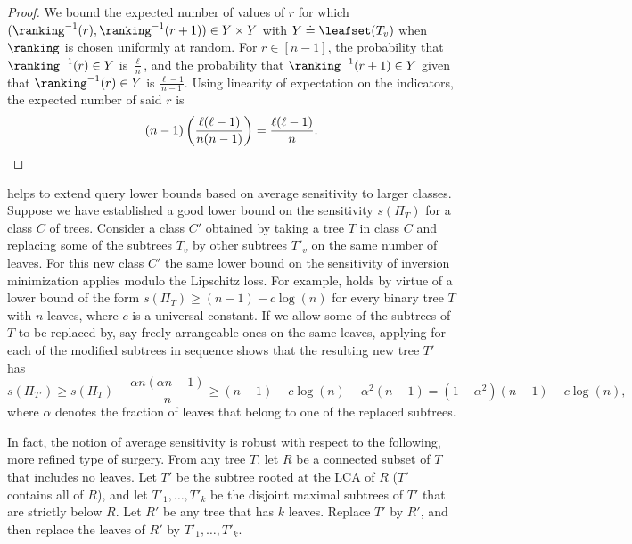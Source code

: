 \documentclass{toc}
\begin{document}
\begin{proof}
We bound the expected number of values of $r$ for which $(\ranking^{-1}(r),\ranking^{-1}(r+1)) \in Y \times Y$ with $Y \doteq \leafset(T_v)$ when $\ranking$ is chosen uniformly at random. For $r \in [n-1]$, the probability that $\ranking^{-1}(r) \in Y$ is $\frac{\ell}{n}$, and the probability that $\ranking^{-1}(r+1)\in Y$ given that $\ranking^{-1}(r)\in Y$ is $\frac{\ell-1}{n-1}$. Using linearity of expectation on the indicators, the expected number of said $r$ is 
    \begin{equation*}
        (n-1)\left(\frac{\ell(\ell-1)}{n(n-1)}\right) = \frac{\ell(\ell-1)}{n}. \qedhere
    \end{equation*}
\end{proof}

 helps to extend query lower bounds based on average sensitivity to larger classes. Suppose we have established a good lower bound on the sensitivity $s(\Pi_T)$ for a class $C$ of trees. Consider a class $C'$ obtained by taking a tree $T$ in class $C$ and replacing some of the subtrees $T_v$ by other subtrees $T'_v$ on the same number of leaves. For this new class $C'$ the same lower bound on the sensitivity of inversion minimization applies modulo the Lipschitz loss. For example,  holds by virtue of a lower bound of the form $s(\Pi_T) \ge (n-1) - c \log(n)$ for every binary tree $T$ with $n$ leaves, where $c$ is a universal constant. If we allow some of the subtrees of $T$ to be replaced by, say freely arrangeable ones on the same leaves, applying  for each of the modified subtrees in sequence shows that the resulting new tree $T'$ has 
\[ s(\Pi_{T'}) \ge s(\Pi_T) - \frac{\alpha n (\alpha n - 1)}{n} 
\ge (n-1) - c \log(n) - \alpha^2 (n-1) = (1-\alpha^2)(n-1) - c \log(n), \]
where $\alpha$ denotes the fraction of leaves that belong to one of the replaced subtrees.

In fact, the notion of average sensitivity is robust with respect to the following, more refined type of surgery. From any tree $T$, let $R$ be a connected subset of $T$ that includes no leaves. Let $T'$ be the subtree rooted at the LCA of $R$ ($T'$ contains all of $R$), and let $T'_1, \dots, T'_k$ be the disjoint maximal subtrees of $T'$ that are strictly below $R$. Let $R'$ be any tree that has $k$ leaves. Replace $T'$ by $R'$, and then replace the leaves of $R'$ by $T'_1, \dots, T'_k$.
\end{document}
